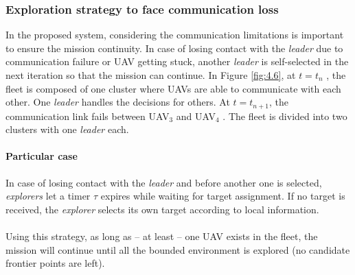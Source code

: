 \documentclass[11pt,openany]{book}
\begin{document}
\subsubsection{Exploration strategy to face communication loss}
In the proposed system, considering the communication limitations is important to ensure the mission continuity. In case of losing contact with the \textit{leader} due to communication failure or UAV getting stuck, another \textit{leader} is self-selected in the next iteration so that the mission can continue. In Figure \ref{fig:4.6}, at $t=t_n$ , the ﬂeet is composed of one cluster where UAVs are able to communicate with each other. One \textit{leader} handles the decisions for others. At $t=t_{n+1}$, the communication link fails between UAV$_3$ and UAV$_4$ . The ﬂeet is divided into two clusters with one \textit{leader} each.
\paragraph{Particular case}
In case of losing contact with the \textit{leader} and before another one is selected, \textit{explorers} let a timer $\tau$ expires while waiting for target assignment. If no target is received, the \textit{explorer} selects its own target according to local information.\\\\
Using this strategy, as long as – at least – one UAV exists in the ﬂeet, the mission will continue until all the bounded environment is explored (no candidate frontier points are left).
\end{document}
